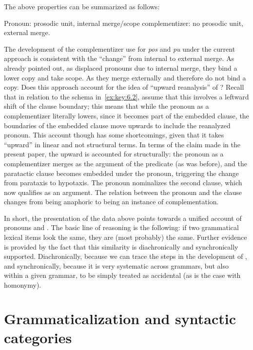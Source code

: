 \documentclass[output=paper]{langsci/langscibook}
\begin{document}
The above properties can be summarized as follows:

\ea\label{ex:key:6.13}
	\ea Pronoun: prosodic unit, internal merge/scope
	\ex complementizer: no prosodic unit, external merge.
	\z
\z

The development of the complementizer use for \emph{pos}
and \emph{pu} under the current approach is consistent with the
\enquote{change} from internal to external merge. As already pointed out, as
displaced pronouns due to internal merge, they bind a lower copy and take
scope. As  they merge externally and therefore do not bind
a copy.  Does this approach account for the idea of \enquote{upward reanalysis}
of \citet{RobRou2003}? Recall that in relation to the schema
in~\eqref{ex:key:6.2}, \citeauthor{RobRou2003} assume that this involves a
leftward shift of the clause boundary; this means that while the pronoun as a
complementizer literally lowers, since it becomes part of the embedded clause,
the boundaries of the embedded clause move upwards to include the reanalyzed
pronoun. This account though has some shortcomings, given that it takes
\enquote{upward} in linear and not structural terms. In terms of the claim made
in the present paper, the upward  is accounted for
structurally: the pronoun as a complementizer merges as the
argument of the predicate (as was before), and the paratactic clause becomes
embedded under the pronoun, triggering the change from parataxis to hypotaxis.
The pronoun nominalizes the second clause, which now qualifies as an argument.
The relation between the pronoun and the clause changes from being anaphoric to
being an instance of complementation.

In short, the presentation of the data above points towards a unified account
of pronouns and . The basic line of reasoning is the following:
if two grammatical lexical items look the same, they are (most probably) the
same. Further evidence is provided by the fact that this similarity is
diachronically and synchronically supported. Diachronically, because we can
trace the steps in the development of , and synchronically,
because it is very systematic across grammars, but also within a given grammar,
to be simply treated as accidental (as is the case with homonymy).

\section{Grammaticalization and syntactic categories}\label{sec:gram-cat}
\end{document}
